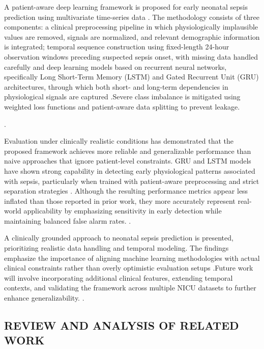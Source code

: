 \documentclass[conference]{IEEEtran}
\begin{document}
A patient-aware deep learning framework is proposed for early neonatal sepsis prediction using multivariate time-series data  \cite{ehr_rnn_sepsis}. The methodology consists of three components: a clinical preprocessing pipeline in which physiologically implausible values are removed, signals are normalized, and relevant demographic information is integrated; temporal sequence construction using fixed-length 24-hour observation windows preceding suspected sepsis onset, with missing data handled carefully and deep learning models based on recurrent neural networks, specifically Long Short-Term Memory (LSTM) and Gated Recurrent Unit (GRU) architectures, through which both short- and long-term dependencies in physiological signals are captured \cite{ehr_rnn_sepsis}.Severe class imbalance is mitigated using weighted loss functions and patient-aware data splitting to prevent leakage.

\cite{los_ml_mdpi}.

Evaluation under clinically realistic conditions has demonstrated that the proposed framework achieves more reliable and generalizable performance than naive approaches that ignore patient-level constraints\cite{plos_ehr_sepsis}.  GRU and LSTM models have shown strong capability in detecting early physiological patterns associated with sepsis, particularly when trained with patient-aware preprocessing and strict separation strategies \cite{ehr_rnn_sepsis}. Although the resulting performance metrics appear less inflated than those reported in prior work, they more accurately represent real-world applicability by emphasizing sensitivity in early detection while maintaining balanced false alarm rates. \cite{los_ml_mdpi}.

A clinically grounded approach to neonatal sepsis prediction is presented, prioritizing realistic data handling and temporal modeling. The findings emphasize the importance of aligning machine learning methodologies with actual clinical constraints rather than overly optimistic evaluation setups \cite{plos_ehr_sepsis}.Future work will involve incorporating additional clinical features, extending temporal contexts, and validating the framework across multiple NICU datasets to further enhance generalizability.
\cite{cnn_psd_sepsis}.\\


\subsection{REVIEW AND ANALYSIS OF RELATED WORK}
\end{document}
